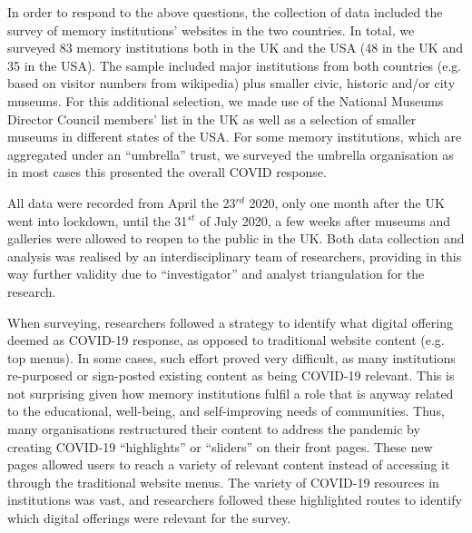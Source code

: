 \documentclass{egpubl}
\begin{document}
In order to respond to the above questions, the collection of data included the survey of memory institutions' websites in the two countries. In total, we surveyed 83 memory institutions both in the UK and the USA (48 in the  UK and 35 in the USA). The sample included major institutions from both countries (e.g. based on visitor numbers from wikipedia) \cite{Wikipedia} plus smaller civic, historic and/or city museums. For this additional selection, we made use of the National Museums Director Council members' list in the UK \cite{nationalmuseums:2020} as well as a selection of smaller museums in different states of the USA. For some memory institutions, which are aggregated under an ``umbrella'' trust, we surveyed the umbrella organisation as in most cases this presented the overall COVID response.

All data were recorded from April the 23$^{rd}$  2020, only one month after the UK went into lockdown, until the 31$^{st}$ of July 2020, a few weeks after museums and galleries were allowed to reopen to the public in the UK. Both data collection and analysis was realised by an interdisciplinary team of researchers, providing in this way further validity due to ``investigator'' and analyst triangulation for the research.


When surveying, researchers followed a strategy to identify what digital offering deemed as COVID-19 response, as opposed to traditional website content (e.g. top menus). In some cases, such effort proved very difficult, as many institutions re-purposed or sign-posted existing content as being COVID-19 relevant. This is not surprising given how memory institutions fulfil a role that is anyway related to the educational, well-being, and self-improving needs of communities. Thus, many organisations restructured their content to address the pandemic by creating COVID-19 ``highlights'' or ``sliders'' on their front pages. These new pages allowed users to reach a variety of relevant content instead of accessing it through the traditional website menus. The variety of COVID-19 resources in institutions was vast, and researchers followed these highlighted routes to identify which digital offerings were relevant for the survey. 
\end{document}
